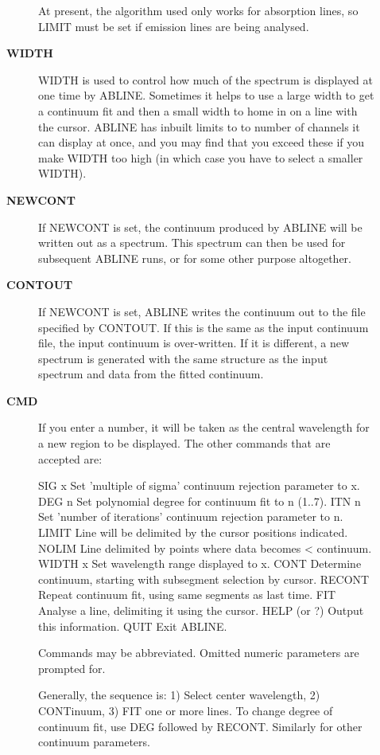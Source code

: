 \begin{description}
\begin{description}
 At present, the algorithm used only works for absorption lines, so
 LIMIT must be set if emission lines are being analysed.
\item [\textbf{WIDTH}]
 WIDTH is used to control how much of the spectrum is displayed at one
 time by ABLINE.  Sometimes it helps to use a large width to get a
 continuum fit and then a small width to home in on a line with the
 cursor.  ABLINE has inbuilt limits to to number of channels it can
 display at once, and you may find that you exceed these if you make
 WIDTH too high (in which case you have to select a smaller WIDTH).
\item [\textbf{NEWCONT}]
 If NEWCONT is set, the continuum produced by ABLINE will be
 written out as a spectrum.  This spectrum can then be used for
 subsequent ABLINE runs, or for some other purpose altogether.
\item [\textbf{CONTOUT}]
 If NEWCONT is set, ABLINE writes the continuum out to the file
 specified by CONTOUT.  If this is the same as the input continuum
 file, the input continuum is over-written.  If it is different, a new
 spectrum is generated with the same structure as the input spectrum
 and data from the fitted continuum.
\item [\textbf{CMD}]
 If you enter a number, it will be taken as the central wavelength for
 a new region to be displayed.  The other commands that are accepted
 are:

   SIG x     Set 'multiple of sigma' continuum rejection parameter
             to x.
   DEG n     Set polynomial degree for continuum fit to n (1..7).
   ITN n     Set 'number of iterations' continuum rejection parameter
             to n.
   LIMIT     Line will be delimited by the cursor positions indicated.
   NOLIM     Line delimited by points where data becomes < continuum.
   WIDTH x   Set wavelength range displayed to x.
   CONT      Determine continuum, starting with subsegment selection
             by cursor.
   RECONT    Repeat continuum fit, using same segments as last time.
   FIT       Analyse a line, delimiting it using the cursor.
   HELP      (or ?) Output this information.
   QUIT      Exit ABLINE.

 Commands may be abbreviated.  Omitted numeric parameters are
 prompted for.

 Generally, the sequence is: 1) Select center wavelength,
 2) CONTinuum, 3) FIT one or more lines.  To change degree of
 continuum fit, use DEG followed by RECONT.  Similarly for other
 continuum parameters.


\end{description}
\end{description}

